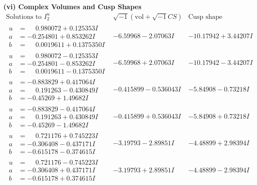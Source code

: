 \documentclass[1p]{elsarticle_modified}
\theoremstyle{definition}
\newcommand{\I}{\sqrt{-1}}
\begin{document}
\newpage\flushleft \textbf{(vi) Complex Volumes and Cusp Shapes}
$$\begin{array}{c|c|c}  
\text{Solutions to }I^u_{2}& \I (\text{vol} + \sqrt{-1}CS) & \text{Cusp shape}\\
 \hline 
\begin{aligned}
u &= \phantom{-}0.980072 + 0.125353 I \\
a &= -0.254801 + 0.853262 I \\
b &= \phantom{-}0.0019611 + 0.1375350 I\end{aligned}
 & -6.59968 - 2.07063 I & -10.17942 + 3.44207 I \\ \hline\begin{aligned}
u &= \phantom{-}0.980072 - 0.125353 I \\
a &= -0.254801 - 0.853262 I \\
b &= \phantom{-}0.0019611 - 0.1375350 I\end{aligned}
 & -6.59968 + 2.07063 I & -10.17942 - 3.44207 I \\ \hline\begin{aligned}
u &= -0.883829 + 0.417064 I \\
a &= \phantom{-}0.191263 - 0.430849 I \\
b &= -0.45269 + 1.49682 I\end{aligned}
 & -0.415899 - 0.536043 I & -5.84908 - 0.73218 I \\ \hline\begin{aligned}
u &= -0.883829 - 0.417064 I \\
a &= \phantom{-}0.191263 + 0.430849 I \\
b &= -0.45269 - 1.49682 I\end{aligned}
 & -0.415899 + 0.536043 I & -5.84908 + 0.73218 I \\ \hline\begin{aligned}
u &= \phantom{-}0.721176 + 0.745223 I \\
a &= -0.306408 - 0.437171 I \\
b &= -0.615178 - 0.374615 I\end{aligned}
 & -3.19793 - 2.89851 I & -4.48899 + 2.98394 I \\ \hline\begin{aligned}
u &= \phantom{-}0.721176 - 0.745223 I \\
a &= -0.306408 + 0.437171 I \\
b &= -0.615178 + 0.374615 I\end{aligned}
 & -3.19793 + 2.89851 I & -4.48899 - 2.98394 I \\ \hline\begin{aligned}

\end{aligned}
\end{array}$$
\end{document}
